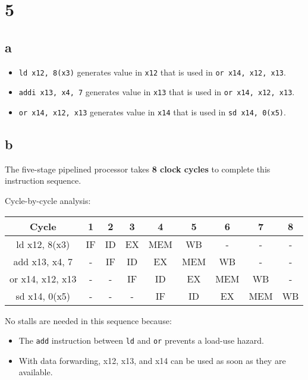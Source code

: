 \documentclass[12pt]{article}
\begin{document}
\section*{5}

\subsection*{a}

\begin{itemize}
    \item \texttt{ld x12, 8(x3)} generates value in \texttt{x12} that is used in \texttt{or x14, x12, x13}.
    \item \texttt{addi x13, x4, 7} generates value in \texttt{x13} that is used in \texttt{or x14, x12, x13}.
    \item \texttt{or x14, x12, x13} generates value in \texttt{x14} that is used in \texttt{sd x14, 0(x5)}.
\end{itemize}

\subsection*{b}

The five-stage pipelined processor takes \textbf{8 clock cycles} to complete this instruction sequence.

Cycle-by-cycle analysis:

\begin{table}[h!]
    \centering
    \begin{tabular}{|c|c|c|c|c|c|c|c|c|}
    \hline
    Cycle            & 1  & 2  & 3  & 4   & 5   & 6   & 7   & 8   \\
    \hline
    ld x12, 8(x3)    & IF & ID & EX & MEM & WB  & -   & -   & -   \\
    add x13, x4, 7   & -  & IF & ID & EX  & MEM & WB  & -   & -   \\
    or x14, x12, x13 & -  & -  & IF & ID  & EX  & MEM & WB  & -   \\
    sd x14, 0(x5)    & -  & -  & -  & IF  & ID  & EX  & MEM & WB  \\
    \hline
    \end{tabular}
\end{table}

No stalls are needed in this sequence because:
\begin{itemize}
    \item The \texttt{add} instruction between \texttt{ld} and \texttt{or} prevents a load-use hazard.
    \item With data forwarding, x12, x13, and x14 can be used as soon as they are available.
\end{itemize}
\end{document}
